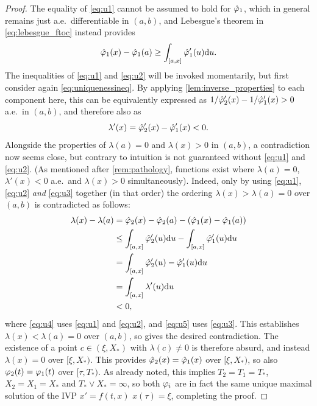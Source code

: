 \begin{proof}
    The equality of \autoref{eq:u1} cannot be assumed to hold for $\hat{\varphi}_1$, which in general remains just a.e.~differentiable in $(a,b)$, and Lebesgue's theorem in \autoref{eq:lebesgue_ftoc} instead provides
        \begin{equation}\label{eq:u2}
            \hat{\varphi}_1(x) - \hat{\varphi}_1(a) \ge \int_{[a,x]} \hat{\varphi}_1'(u)\mathrm{d} u.
        \end{equation}
    The inequalities of \autoref{eq:u1} and \autoref{eq:u2} will be invoked momentarily, but first consider again \autoref{eq:uniquenessineq}. By applying \autoref{lem:inverse_properties} to each component here, this can be equivalently expressed as $1/\hat{\varphi}'_2(x) - 1/\hat{\varphi}'_1(x) > 0$ a.e.~in $(a,b)$, and therefore also as
    \begin{equation}\label{eq:u3}
        \lambda'(x) = \hat{\varphi}'_2(x) - \hat{\varphi}'_1(x) < 0.
    \end{equation}
    Alongside the properties of $\lambda(a)=0$ and $\lambda(x)>0$ in $(a,b)$, a contradiction now seems close, but contrary to intuition is not guaranteed without \autoref{eq:u1} and \autoref{eq:u2}. (As mentioned after \autoref{rem:pathology}, functions exist where $\lambda(a)=0$, $\lambda'(x)<0$ a.e.~and $\lambda(x)>0$ simultaneously). Indeed, only by using \autoref{eq:u1}, \autoref{eq:u2} \emph{and} \autoref{eq:u3} together (in that order) the ordering $\lambda(x)>\lambda(a)=0$ over $(a,b)$ is contradicted as follows:
    \begin{align}
        \lambda(x)-\lambda(a) &= \hat{\varphi}_2(x) - \hat{\varphi}_2(a) - (\hat{\varphi}_1(x) - \hat{\varphi}_1(a)) \nonumber\\
        &\le \int_{[a,x]} \hat{\varphi}_2'(u)\mathrm{d} u - \int_{[a,x]} \hat{\varphi}_1'(u)\mathrm{d} u \label{eq:u4} \\
        &= \int_{[a,x]} \hat{\varphi}_2'(u)- \hat{\varphi}_1'(u)\mathrm{d} u \nonumber\\
        &= \int_{[a,x]} \lambda'(u)\mathrm{d} u\nonumber\\
        &< 0,\label{eq:u5}
    \end{align}
    where \eqref{eq:u4} uses \autoref{eq:u1} and \autoref{eq:u2}, and \eqref{eq:u5} uses \autoref{eq:u3}. This establishes $\lambda(x)<\lambda(a)=0$ over $(a,b)$, so gives the desired contradiction. The existence of a point $c\in(\xi,X_*)$ with $\lambda(c)\neq0$ is therefore absurd, and instead $\lambda(x)=0$ over $[\xi,X_*)$. This provides $\hat{\varphi}_2(x)=\hat{\varphi}_1(x)$ over $[\xi,X_*)$, so also $\varphi_2(t)=\varphi_1(t)$ over $[\tau,T_*)$. As already noted, this implies $T_2=T_1=T_*$, $X_2=X_1=X_*$ and $T_*\vee X_*=\infty$, so both $\varphi_i$ are in fact the same unique maximal solution of the IVP $x'=f(t,x)$ $x(\tau)=\xi$, completing the proof.
\end{proof}

